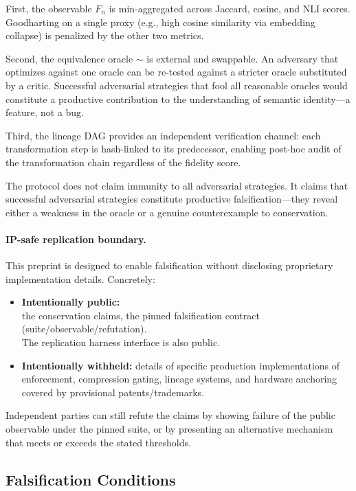\documentclass[11pt,a4paper]{article}
\begin{document}
First, the observable $F_n$ is min-aggregated across Jaccard, cosine, and NLI scores. Goodharting on a single proxy (e.g., high cosine similarity via embedding collapse) is penalized by the other two metrics.

Second, the equivalence oracle $\sim$ is external and swappable. An adversary that optimizes against one oracle can be re-tested against a stricter oracle substituted by a critic. Successful adversarial strategies that fool all reasonable oracles would constitute a productive contribution to the understanding of semantic identity---a feature, not a bug.

Third, the lineage DAG provides an independent verification channel: each transformation step is hash-linked to its predecessor, enabling post-hoc audit of the transformation chain regardless of the fidelity score.

The protocol does not claim immunity to all adversarial strategies. It claims that successful adversarial strategies constitute productive falsification---they reveal either a weakness in the oracle or a genuine counterexample to conservation.

\paragraph{IP-safe replication boundary.} This preprint is designed to enable falsification without disclosing proprietary implementation details. Concretely:
\begin{itemize}
    \item \textbf{Intentionally public:}\\
    the conservation claims, the pinned falsification contract (suite/observable/refutation).\\
    The replication harness interface is also public.
    \item \textbf{Intentionally withheld:} details of specific production implementations of enforcement, compression gating, lineage systems, and hardware anchoring covered by provisional patents/trademarks.
\end{itemize}
Independent parties can still refute the claims by showing failure of the public observable under the pinned suite, or by presenting an alternative mechanism that meets or exceeds the stated thresholds.

\subsection{Falsification Conditions}
\end{document}
